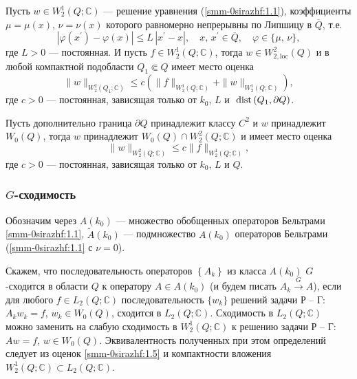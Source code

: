 \begin{theorem}\label{smm2-th2} Пусть $w\in W_2^1(Q;\mathbb{C})$ --- решение уравнения  {(\ref{smm-0sirazhf:1.1})}, коэффициенты $\mu=\mu(x)$, $\nu=\nu(x)$ которого равномерно непрерывны по Липшицу в $\overline Q$, т.е.
	$$
	|\varphi(x^\prime)-\varphi(x)|\leqslant L\,|x^\prime-x|,\quad x,\,x^\prime\in \overline{Q},\quad \varphi\in\{\mu,\,\nu\},
	$$
	где $L>0$ --- постоянная. И пусть  $f\in W_2^1(Q;\mathbb{C})$, тогда $w\in W_{2,\text{loc}}^2(Q)$ и в любой компактной подобласти $Q_1\Subset Q$ имеет место оценка
	\begin{equation}\label{smm-0sirazhf:1.6_1}
		\|w\|_{W^2_2(Q_1; \mathbb{C})}\leqslant c\left(\|f\|_{W^1_2(Q; \mathbb{C})}+\|w\|_{W^1_2(Q; \mathbb{C})}\right),
	\end{equation}
	где $c>0$ --- постоянная, зависящая только от $k_0$, $L$ и $\text{ dist\,}(Q_1,\partial Q)$.


Пусть дополнительно граница $\partial Q$ принадлежит классу $C^2$ и $w$ принадлежит $W_0(Q)$, тогда $w$ принадлежит $W_0(Q)\cap W_2^2(Q; \mathbb{C})$ и имеет место оценка
\begin{equation}\label{smm-0sirazhf:1.6_2}
	\|w\|_{W^2_2(Q; \mathbb{C})}\leqslant c\|f\|_{W^1_2(Q; \mathbb{C})},
\end{equation}
где $c>0$ --- постоянная, зависящая только от $k_0$, $L$ и $Q$.
\end{theorem}

\subsubsection{$G$-сходимость}
Обозначим через $A(k_0)$ --- множество обобщенных  операторов Бельтрами
\eqref{smm-0sirazhf:1.1}, $\tilde{A}(k_0)$ --- подмножество $A(k_0)$  операторов Бельтрами
(\eqref{smm-0sirazhf:1.1} с $\nu=0$).

\begin{definition}
Скажем, что последовательность операторов $\left\{ \textit{A}_k\right\}$ из класса $A(k_0)$
$G$-сходится в области $Q$ к оператору $A\in A(k_0)$
(и будем писать $A_k\overset{G}{\longrightarrow} A$),
если для любого $f\in L_2(Q;\mathbb{C})$ последовательность $\{w_k\}$ решений задачи Р -- Г: $A_kw_k=f$, $w_k\in W_0(Q)$,
сходится в $L_2(Q;\mathbb{C})$. Сходимость в
$L_2(Q;\mathbb{C})$ можно заменить на слабую сходимость в
$W_2^1(Q;\mathbb{C})$ к решению задачи Р -- Г: $Aw=f$, $w\in W_0(Q)$. Эквивалентность полученных при этом определений следует из оценок \eqref{smm-0sirazhf:1.5} и компактности вложения
$W_2^1(Q;\mathbb{C})\subset L_2(Q;\mathbb{C})$.
\end{definition}

